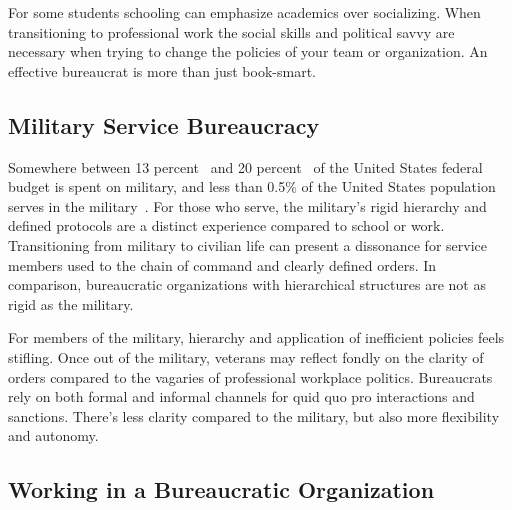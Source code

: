 For some students schooling can emphasize academics over socializing. When transitioning to professional work the social skills and political savvy are necessary when trying to change the policies of your team or organization. An effective bureaucrat is more than just book-smart. 









\subsection*{Military Service Bureaucracy\label{bureaucracy-of-military}}
Somewhere between 13 percent~\cite{2023_cbpp} and 
20 percent~\cite{2019_Koshgarian} of 
the United States federal budget is spent on military, and 
less than 0.5\% of the United States population serves in the
military~\cite{2020_demo_mil_CFR}.
For those who serve, the military's rigid hierarchy and defined protocols are a distinct experience compared to school or work. Transitioning from military to civilian life can present a dissonance for service members used to the chain of command and clearly defined orders. In comparison, bureaucratic organizations with hierarchical structures are not as rigid as the military. 

For members of the military, hierarchy and application of inefficient policies feels stifling. Once out of the military, veterans may reflect fondly on the clarity of orders compared to the vagaries of professional workplace politics.  Bureaucrats rely on both formal and informal channels for quid quo pro interactions and sanctions. There's less clarity compared to the military, but also more flexibility and autonomy. 

\subsection*{Working in a Bureaucratic Organization\label{sec:bureaucracy-of-work}}

